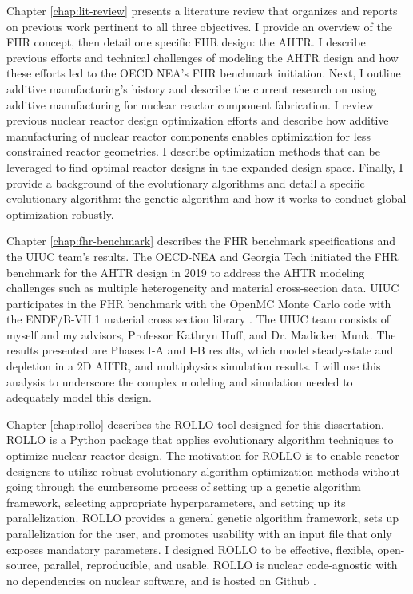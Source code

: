 Chapter \ref{chap:lit-review} presents a literature review that organizes and 
reports on previous work pertinent to all three objectives. 
I provide an overview of the \gls{FHR} concept, then detail one specific 
\gls{FHR} design: the \gls{AHTR}. 
I describe previous efforts and technical challenges of modeling the \gls{AHTR} design
and how these efforts led to the \gls{OECD} \gls{NEA}'s \gls{FHR} benchmark initiation.
Next, I outline additive manufacturing's history and describe the current 
research on using additive manufacturing for nuclear reactor component fabrication. 
I review previous nuclear reactor design optimization efforts and describe how 
additive manufacturing of nuclear reactor components enables optimization for 
less constrained reactor geometries. 
I describe optimization methods that can be leveraged to find optimal reactor 
designs in the expanded design space.
Finally, I provide a background of the evolutionary algorithms and detail a specific 
evolutionary algorithm: the genetic algorithm and how it works to conduct global 
optimization robustly.

Chapter \ref{chap:fhr-benchmark} describes the \gls{FHR} benchmark specifications and 
the \gls{UIUC} team's results.
The \gls{OECD}-\gls{NEA} and \gls{Georgia Tech} initiated the \gls{FHR} 
benchmark for the \gls{AHTR} design in 2019 \cite{petrovic_benchmark_2021} 
to address the \gls{AHTR} modeling challenges such as multiple heterogeneity and 
material cross-section data. 
\gls{UIUC} participates in the \gls{FHR} benchmark with the OpenMC Monte Carlo code 
\cite{romano_openmc_2013} with the ENDF/B-VII.1 material cross section library 
\cite{chadwick_endf/b-vii.1_2011}.
The \gls{UIUC} team consists of myself and my advisors, Professor Kathryn Huff, 
and Dr. Madicken Munk. 
The results presented are Phases I-A and I-B results, which model steady-state and 
depletion in a 2D \gls{AHTR}, and multiphysics simulation results. 
I will use this analysis to underscore the complex modeling and simulation needed to 
adequately model this design. 

Chapter \ref{chap:rollo} describes the \acrfull{ROLLO} tool designed for this 
dissertation. 
\gls{ROLLO} is a Python package that applies evolutionary algorithm 
techniques to optimize nuclear reactor design. 
The motivation for \gls{ROLLO} is to enable reactor designers to utilize 
robust evolutionary algorithm optimization methods without going 
through the cumbersome process of setting up a genetic algorithm framework,
selecting appropriate hyperparameters, and setting up its parallelization. 
\gls{ROLLO} provides a general genetic algorithm framework, sets up 
parallelization for the user, and promotes usability with an input file 
that only exposes mandatory parameters.
I designed  \gls{ROLLO} to be effective, flexible, open-source, parallel, 
reproducible, and usable. 
\gls{ROLLO} is nuclear code-agnostic with no dependencies on  
nuclear software, and is hosted on Github \cite{chee_rollo_2021}. 

